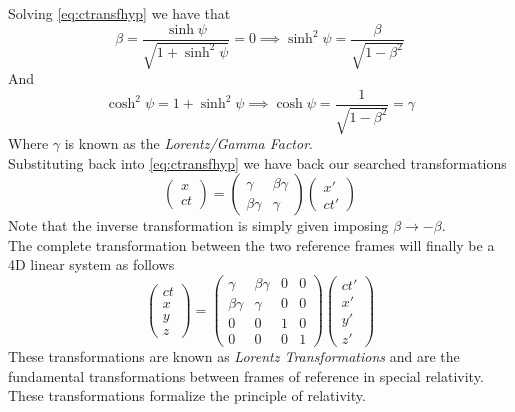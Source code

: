 \documentclass[../admech.tex]{subfiles}
\begin{document}
Solving \eqref{eq:ctransfhyp} we have that
\begin{equation}
	\beta=\frac{\sinh\psi}{\sqrt{1+\sinh^2\psi}}=0\implies\sinh^2\psi=\frac{\beta}{\sqrt{1-\beta^2}}
	\label{eq:sinh1}
\end{equation}
And
\begin{equation}
	\cosh^2\psi=1+\sinh^2\psi\implies\cosh\psi=\frac{1}{\sqrt{1-\beta^2}}=\gamma
	\label{eq:gammafactor}
\end{equation}
Where $\gamma$ is known as the \emph{Lorentz/Gamma Factor}.\\
Substituting back into \eqref{eq:ctransfhyp} we have back our searched transformations
\begin{equation}
	\begin{pmatrix}x\\ct\end{pmatrix}=\begin{pmatrix}\gamma&\beta\gamma\\\beta\gamma&\gamma\end{pmatrix}\begin{pmatrix}x'\\ct'\end{pmatrix}
	\label{eq:lorentzmatrix}
\end{equation}
Note that the inverse transformation is simply given imposing $\beta\to-\beta$.\\
The complete transformation between the two reference frames will finally be a 4D linear system as follows
\begin{equation}
	\begin{pmatrix}ct\\x\\y\\z\end{pmatrix}=\begin{pmatrix}\gamma&\beta\gamma&0&0\\\beta\gamma&\gamma&0&0\\0&0&1&0\\0&0&0&1\end{pmatrix}\begin{pmatrix}ct'\\x'\\y'\\z'\end{pmatrix}
	\label{eq:lorentztransformations}
\end{equation}
These transformations are known as \emph{Lorentz Transformations} and are the fundamental transformations between frames of reference in special relativity. These transformations formalize the principle of relativity.
\end{document}
